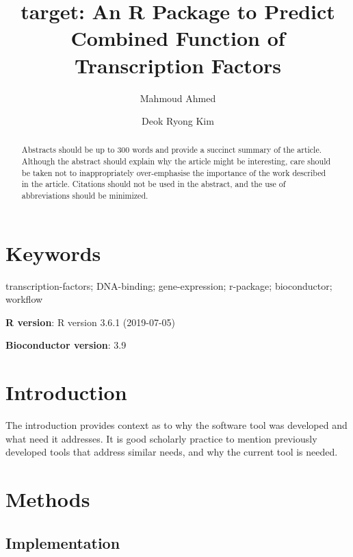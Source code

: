 \documentclass[9pt,a4paper,]{extarticle}
\begin{document}
\pagestyle{front}

\title{target: An R Package to Predict Combined Function of Transcription Factors}

\author[1]{Mahmoud Ahmed}
\author[1]{Deok Ryong Kim}

\maketitle
\thispagestyle{front}

\begin{abstract}
Abstracts should be up to 300 words and provide a succinct summary of the article. Although the abstract should explain why the article might be interesting, care should be taken not to inappropriately over-emphasise the importance of the work described in the article. Citations should not be used in the abstract, and the use of abbreviations should be minimized.
\end{abstract}

\section*{Keywords}
transcription-factors; DNA-binding; gene-expression; r-package; bioconductor; workflow


\clearpage
\pagestyle{main}

\textbf{R version}: R version 3.6.1 (2019-07-05)

\textbf{Bioconductor version}: 3.9

\hypertarget{introduction}{%
\section{Introduction}\label{introduction}}

The introduction provides context as to why the software tool was developed and what need it addresses. It is good scholarly practice to mention previously developed tools that address similar needs, and why the current tool is needed.

\hypertarget{methods}{%
\section{Methods}\label{methods}}

\hypertarget{implementation}{%
\subsection{Implementation}\label{implementation}}
\end{document}
